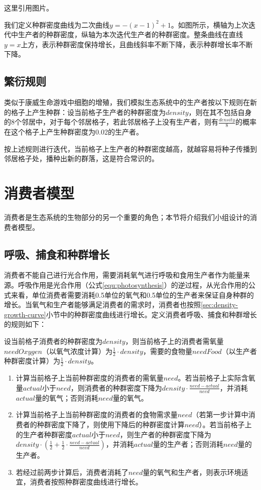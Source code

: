 \documentclass{ctexart}
\begin{document}
这里引用图片。

我们定义种群密度曲线为二次曲线$y = -(x-1)^2 + 1$。如图所示，横轴为上次迭代中生产者的种群密度，纵轴为本次迭代生产者的种群密度。整条曲线在直线$y=x$上方，表示种群密度保持增长，且曲线斜率不断下降，表示种群增长率不断下降。

\subsection{繁衍规则}

类似于康威生命游戏中细胞的增殖，我们模拟生态系统中的生产者按以下规则在新的格子上产生种群：设当前格子生产者的种群密度为$density$，则在其不包括自身的8个邻居中，对于每个邻居格子，若此邻居格子上没有生产者，则有$\frac{density}{8}$的概率在这个格子上产生种群密度为0.02的生产者。

按上述规则进行迭代，当前格子上生产者的种群密度越高，就越容易将种子传播到邻居格子处，播种出新的群落，这是符合常识的。

\section{消费者模型}

消费者是生态系统的生物部分的另一个重要的角色；本节将介绍我们小组设计的消费者模型。

\subsection{呼吸、捕食和种群增长} \label{sec:consumer-growth-rule}

消费者不能自己进行光合作用，需要消耗氧气进行呼吸和食用生产者作为能量来源。呼吸作用是光合作用（公式\ref{equ:photosynthesis}）的逆过程，从光合作用的公式来看，单位消费者需要消耗0.5单位的氧气和0.5单位的生产者来保证自身种群的增长。当氧气和生产者能够满足消费者的需求时，消费者也按照\ref{sec:density-growth-curve}小节中的种群密度曲线进行增长。定义消费者呼吸、捕食和种群增长的规则如下：

设当前格子消费者的种群密度为$density$，则当前格子上的消费者需氧量$needOxygen$（以氧气浓度计算）为$\frac {1}{2} \cdot density$，需要的食物量$needFood$（以生产者种群密度计算）为$\frac {1}{2} \cdot density$。

\begin{enumerate}
  \item 计算当前格子上当前种群密度的消费者的需氧量$need$。若当前格子上实际含氧量$actual$小于$need$，则消费者的种群密度下降为$density \cdot \frac{need - actual}{need}$，并消耗$actual$量的氧气；否则消耗$need$量的氧气。
  \item 计算当前格子上当前种群密度的消费者的食物需求量$need$（若第一步计算中消费者的种群密度下降了，则使用下降后的种群密度计算$need$）。若当前格子上的生产者种群密度$actual$小于$need$，则生产者的种群密度下降为$density \cdot (\frac{1}{2} + \frac{1}{2} \cdot \frac{need - actual}{need})$，并消耗$actual$量的生产者；否则消耗$need$量的生产者。
  \item 若经过前两步计算后，消费者消耗了$need$量的氧气和生产者，则表示环境适宜，消费者按照种群密度曲线进行增长。
\end{enumerate}
\end{document}
